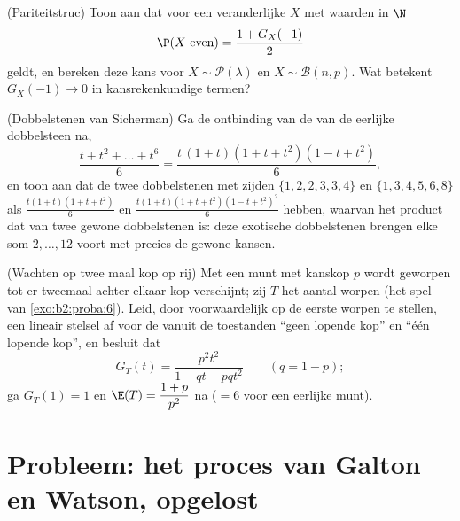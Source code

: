 \begin{exercise}[$\star$]\label{exo:b2:genfun:10}
(Pariteitstruc) Toon aan dat voor een veranderlijke $X$ met waarden
in $\N$
\[
\P(X \text{ even}) = \frac{1 + G_X(-1)}{2}
\]
geldt, en bereken deze kans voor $X \sim \mathcal P(\lambda)$ en $X
\sim \mathcal B(n, p)$. Wat betekent $G_X(-1) \to 0$ in
kansrekenkundige termen?
\end{exercise}

\begin{exercise}[$\star\star$]\label{exo:b2:genfun:11}
(Dobbelstenen van Sicherman) Ga de ontbinding van de  van de eerlijke dobbelsteen na,
\[
\frac{t + t^2 + \dots + t^6}{6}
= \frac{t\,(1 + t)(1 + t + t^2)(1 - t + t^2)}{6},
\]
en toon aan dat de twee dobbelstenen met zijden $\{1, 2, 2, 3, 3,
4\}$ en $\{1, 3, 4, 5, 6, 8\}$ als 
$\frac{t(1+t)(1+t+t^2)}6$ en
$\frac{t(1+t)(1+t+t^2)(1-t+t^2)^2}6$ hebben, waarvan het product
dat van twee gewone dobbelstenen is: deze exotische dobbelstenen
brengen elke som $2, \dots, 12$ voort met precies de gewone kansen.
\end{exercise}

\begin{exercise}[$\star\star\star$]\label{exo:b2:genfun:12}
(Wachten op twee maal kop op rij) Met een munt met kanskop $p$
wordt geworpen tot er tweemaal achter elkaar kop verschijnt; zij
$T$ het aantal worpen (het spel van \cref{exo:b2:proba:6}). Leid,
door voorwaardelijk op de eerste worpen te stellen, een lineair
stelsel af voor de  vanuit de toestanden ``geen
lopende kop'' en ``één lopende kop'', en besluit dat
\[
G_T(t) = \frac{p^2t^2}{1 - qt - pqt^2}
\qquad (q = 1 - p);
\]
ga $G_T(1) = 1$ en $\E(T) = \dfrac{1 + p}{p^2}$ na ($= 6$ voor een
eerlijke munt).
\end{exercise}

\section{Probleem: het proces van Galton en Watson, opgelost}

